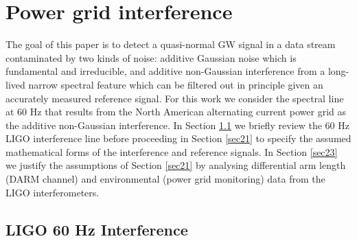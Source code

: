 \documentclass[pra,superscriptaddress,reprint,amsmath,amssymb,nofootinbib]{revtex4-2}
\begin{document}
\section{Power grid interference} \label{sec:pgi}
The goal of this paper is to detect a quasi-normal GW signal in a data stream contaminated by two kinds of noise: additive Gaussian noise which is fundamental and irreducible, and additive non-Gaussian interference from a long-lived narrow spectral feature which can be filtered out in principle given an accurately measured reference signal. For this work we consider the spectral line at 60 Hz that results from the North American alternating current power grid as the additive non-Gaussian interference. In Section \ref{sec22} we briefly review the 60 Hz LIGO interference line before proceeding in Section \ref{sec21} to specify the assumed mathematical forms of the interference and reference signals. In Section \ref{sec23} we justify the assumptions of Section \ref{sec21} by analysing differential arm length (DARM channel) and environmental (power grid monitoring) data from the LIGO interferometers. 


\subsection{LIGO 60 Hz Interference}  \label{sec22}
\end{document}
